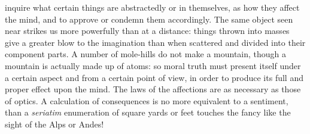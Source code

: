 inquire what certain things are abstractedly or in themselves, as
how they affect the mind, and to approve or condemn them
accordingly. The same object seen near strikes us more powerfully
than at a distance: things thrown into masses give a greater blow
to the imagination than when scattered and divided into their
component parts. A number of mole-hills do not make a mountain,
though a mountain is actually made up of atoms: so moral truth
must present itself under a certain aspect and from a certain
point of view, in order to produce its full and proper effect upon
the mind. The laws of the affections are as necessary as those of
optics. A calculation of consequences is no more equivalent to a
sentiment, than a \emph{seriatim} enumeration of square yards or
feet touches the fancy like the sight of the Alps or Andes!

